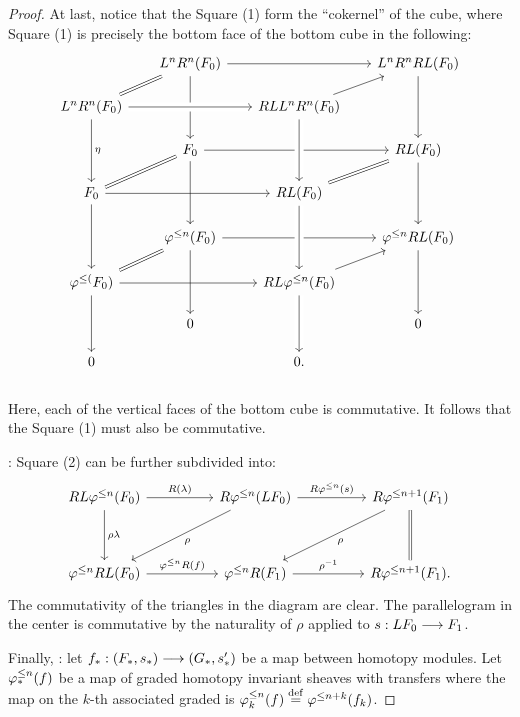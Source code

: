 \begin{proof}
At last, notice that the Square (1) form the ``cokernel'' of the
cube, where Square (1) is precisely the bottom face of the bottom
cube in the following:
\[
\begin{tikzcd}[row sep=scriptsize, column sep=scriptsize]
& L^nR^n(F_0) \arrow[equals]{dl}\arrow{rr}\arrow{dd}{\eta} & & 
   L^nR^nRL(F_0) \arrow{dd} \\
L^nR^n(F_0) \arrow[crossing over]{rr}\arrow{dd}{\eta} & & 
   RLL^nR^n(F_0) \arrow{ur} \\
& F_0 \arrow[equals]{dl}\arrow{rr} \arrow{dd} & & RL(F_0) \arrow{dd}
   \arrow[equals]{dl} \\
F_0 \arrow{rr} \arrow{dd} & & 
   RL(F_0) \arrow[crossing over, leftarrow]{uu} \\
& \tlHI{n}(F_0) \arrow[equals]{dl}\arrow{rr} \arrow{dd} & & 
   \tlHI{n} RL(F_0) \arrow[leftarrow]{dl} \arrow{dd}\\
\tlHI(F_0) \arrow{rr} \arrow{dd} & & 
   RL\tlHI{n}(F_0) \arrow[crossing over, leftarrow]{uu} \\
& 0 & & 0 \\ 0 & & 0. \arrow[crossing over, leftarrow]{uu} \\
\end{tikzcd}
\]
Here, each of the vertical faces of the bottom cube is commutative.
It follows that the Square (1) must also be commutative.

 : Square (2) can be further 
subdivided into:
\[
\begin{tikzcd}[row sep=huge, column sep=huge]
RL\tlHI{n}(F_0) \arrow{r}{R(\lambda)} \arrow{d}{\rho\lambda} &
R\tlHI{n}(LF_0) \arrow{ld}{\rho} \arrow{r}{R\tlHI{n}(\susp)} &
R\tlHI{n + 1}(F_1) \arrow{ld}{\rho} \arrow[equals]{d} \\
\tlHI{n} RL(F_0) \arrow{r}{\tlHI{n} R(f)} &
\tlHI{n} R(F_1) \arrow{r}{\rho^{-1}} &
R\tlHI{n + 1}(F_1).
\end{tikzcd}
\]
The commutativity of the triangles in the diagram are clear. The 
parallelogram in the center is commutative by the naturality of
$\rho$ applied to $\susp: LF_0 \to F_1$.

Finally, 
 : let $f_*: (F_*,\susp_*) \to 
(G_*, \susp_*')$ be a map between homotopy modules. Let 
$\tlHM{n}(f)$ be a map of graded homotopy invariant sheaves with 
transfers where the map on the $k$-th associated graded is 
$\tlHM[k]{n}(f) \defeq \tlHI{n + k}(f_k)$. 


\end{proof}
